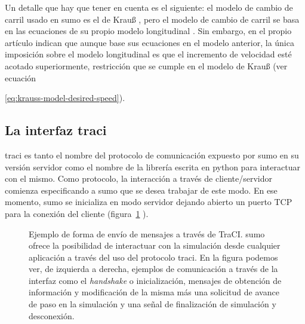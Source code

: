 Un detalle que hay que tener en cuenta es el siguiente: el modelo de cambio de carril usado en \gls{sumo} es el de Krauß \cite{krauss1998microscopic}, pero el modelo de cambio de carril se basa en las ecuaciones de su propio modelo longitudinal \cite{Gipps1981}. Sin embargo, en el propio artículo indican que aunque base sus ecuaciones en el modelo anterior, la única imposición sobre el modelo longitudinal es que el incremento de velocidad esté acotado superiormente, restricción que se cumple en el modelo de Krauß (ver ecuación{\ref{eq:krauss-model-desired-speed}).

\subsection{La interfaz \gls{traci}}

\gls{traci} \cite{Wegener2008} es tanto el nombre del protocolo de comunicación expuesto por \gls{sumo} en su versión servidor como el nombre de la librería escrita en \gls{python} para interactuar con el mismo. Como protocolo, la interacción a través de cliente/servidor comienza especificando a \gls{sumo} que se desea trabajar de este modo. En ese momento, \gls{sumo} se inicializa en modo servidor dejando abierto un puerto TCP para la conexión del cliente (figura~\ref{fig:traci-messages} ).

\begin{figure}
	\centering
	\caption[Ejemplo de forma de envío de mensajes a través de TraCI]{Ejemplo de forma de envío de mensajes a través de TraCI. \gls{sumo} ofrece la posibilidad de interactuar con la simulación desde cualquier aplicación a través del uso del protocolo \gls{traci}. En la figura podemos ver, de izquierda a derecha, ejemplos de comunicación a través de la interfaz como el \textit{handshake} o inicialización, mensajes de obtención de información y modificación de la misma más una solicitud de avance de paso en la simulación y una señal de finalización de simulación y desconexión.}
	\label{fig:traci-messages}
\end{figure}

}
